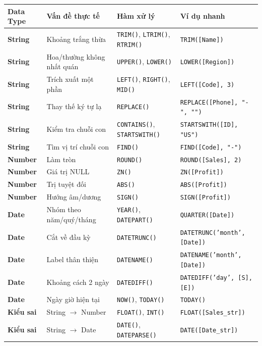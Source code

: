 \documentclass[12pt]{article}
\begin{document}
\begin{center}
\renewcommand{\arraystretch}{1.3}
\small
\begin{tabularx}{\linewidth}{l X l X}
\toprule
\textbf{Data Type} & \textbf{Vấn đề thực tế} & \textbf{Hàm xử lý} & \textbf{Ví dụ nhanh} \\
\midrule
\textbf{String} & Khoảng trắng thừa & \texttt{TRIM()}, \texttt{LTRIM()}, \texttt{RTRIM()} & \texttt{TRIM([Name])} \\
\textbf{String} & Hoa/thường không nhất quán & \texttt{UPPER()}, \texttt{LOWER()} & \texttt{LOWER([Region])} \\
\textbf{String} & Trích xuất một phần & \texttt{LEFT()}, \texttt{RIGHT()}, \texttt{MID()} & \texttt{LEFT([Code], 3)} \\
\textbf{String} & Thay thế ký tự lạ & \texttt{REPLACE()} & \texttt{REPLACE([Phone], "-", "")} \\
\textbf{String} & Kiểm tra chuỗi con & \texttt{CONTAINS()}, \texttt{STARTSWITH()} & \texttt{STARTSWITH([ID], "US")} \\
\textbf{String} & Tìm vị trí chuỗi con & \texttt{FIND()} & \texttt{FIND([Code], "-")} \\
\midrule
\textbf{Number} & Làm tròn & \texttt{ROUND()} & \texttt{ROUND([Sales], 2)} \\
\textbf{Number} & Giá trị NULL & \texttt{ZN()} & \texttt{ZN([Profit])} \\
\textbf{Number} & Trị tuyệt đối & \texttt{ABS()} & \texttt{ABS([Profit])} \\
\textbf{Number} & Hướng âm/dương & \texttt{SIGN()} & \texttt{SIGN([Profit])} \\
\midrule
\textbf{Date} & Nhóm theo năm/quý/tháng & \texttt{YEAR()}, \texttt{DATEPART()} & \texttt{QUARTER([Date])} \\
\textbf{Date} & Cắt về đầu kỳ & \texttt{DATETRUNC()} & \texttt{DATETRUNC('month', [Date])} \\
\textbf{Date} & Label thân thiện & \texttt{DATENAME()} & \texttt{DATENAME('month', [Date])} \\
\textbf{Date} & Khoảng cách 2 ngày & \texttt{DATEDIFF()} & \texttt{DATEDIFF('day', [S], [E])} \\
\textbf{Date} & Ngày giờ hiện tại & \texttt{NOW()}, \texttt{TODAY()} & \texttt{TODAY()} \\
\midrule
\textbf{Kiểu sai} & String $\rightarrow$ Number & \texttt{FLOAT()}, \texttt{INT()} & \texttt{FLOAT([Sales\_str])} \\
\textbf{Kiểu sai} & String $\rightarrow$ Date & \texttt{DATE()}, \texttt{DATEPARSE()} & \texttt{DATE([Date\_str])} \\

\end{tabularx}
\end{center}
\end{document}
